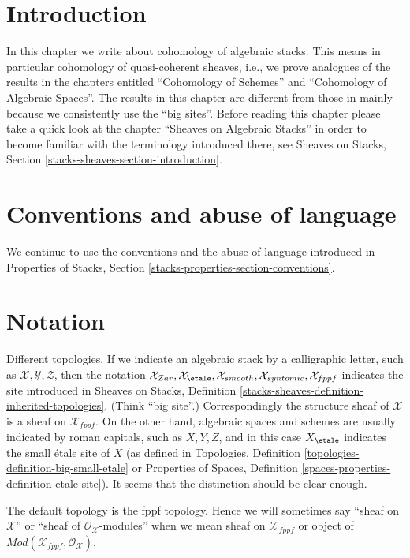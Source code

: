 \section{Introduction}
\label{stacks-cohomology-section-introduction}
In this chapter we write about cohomology of algebraic stacks.
This means in particular cohomology of quasi-coherent sheaves, i.e.,
we prove analogues of the results in the chapters entitled
``Cohomology of Schemes'' and ``Cohomology of Algebraic Spaces''.
The results in this chapter are different
from those in \cite{LM-B} mainly because we consistently use the
``big sites''. Before reading this chapter please take a quick look at
the chapter ``Sheaves on Algebraic Stacks'' in order to become
familiar with the terminology introduced there, see
Sheaves on Stacks, Section \ref{stacks-sheaves-section-introduction}.

\section{Conventions and abuse of language}
\label{stacks-cohomology-section-conventions}
We continue to use the conventions and the abuse of language
introduced in
Properties of Stacks, Section \ref{stacks-properties-section-conventions}.

\section{Notation}
\label{stacks-cohomology-section-notation}
Different topologies. If we indicate an algebraic stack by a calligraphic
letter, such as $\mathcal{X}, \mathcal{Y}, \mathcal{Z}$, then the notation
$\mathcal{X}_{Zar}, \mathcal{X}_\etale, \mathcal{X}_{smooth},
\mathcal{X}_{syntomic}, \mathcal{X}_{fppf}$ indicates the site introduced
in
Sheaves on Stacks, Definition
\ref{stacks-sheaves-definition-inherited-topologies}.
(Think ``big site''.) Correspondingly the structure sheaf of
$\mathcal{X}$ is a sheaf on $\mathcal{X}_{fppf}$.
On the other hand, algebraic spaces and schemes
are usually indicated by roman capitals, such as $X, Y, Z$, and in this case
$X_\etale$ indicates the small \'etale site of $X$ (as
defined in
Topologies, Definition
\ref{topologies-definition-big-small-etale}
or
Properties of Spaces, Definition
\ref{spaces-properties-definition-etale-site}).
It seems that the distinction should be clear enough.

\medskip\noindent
The default topology is the fppf topology. Hence we will sometimes
say ``sheaf on $\mathcal{X}$'' or ``sheaf of $\mathcal{O}_\mathcal{X}$-modules''
when we mean sheaf on $\mathcal{X}_{fppf}$ or object of
$\textit{Mod}(\mathcal{X}_{fppf}, \mathcal{O}_\mathcal{X})$.

